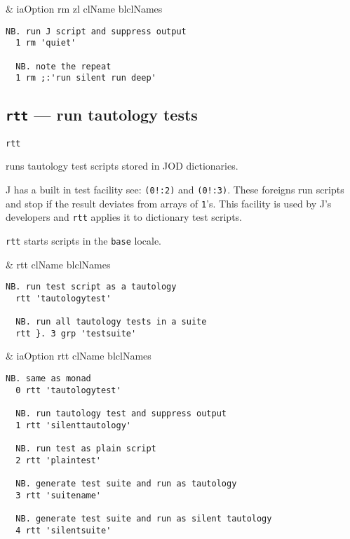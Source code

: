 \begin{wordhead}
\dyad & iaOption rm zl \argsep clName \argsep blclNames \\
\end{wordhead}
\begin{lstlisting}[frame=single,framerule=0pt] 
  NB. run J script and suppress output 
  1 rm 'quiet' 

  NB. note the repeat 
  1 rm ;:'run silent run deep' 
\end{lstlisting}                  


\subsection{\texttt{rtt} --- run tautology tests}\label{ss:rtt}

\hypertarget{il:rtt}{\texttt{rtt}} runs tautology 
test scripts stored in JOD dictionaries. 

J has a built in test facility see: \verb|(0!:2)| and \verb|(0!:3)|.  
These foreigns run scripts and stop if the result deviates 
from arrays of \texttt{1}'s.  This facility is used by J's developers 
and \texttt{rtt} applies it to dictionary test scripts.  
  
\texttt{rtt} starts scripts in the \texttt{base} locale. 

\begin{wordhead}
\monad & rtt clName \argsep blclNames \\
\end{wordhead}
\begin{lstlisting}[frame=single,framerule=0pt] 
  NB. run test script as a tautology
  rtt 'tautologytest'    
  
  NB. run all tautology tests in a suite 
  rtt }. 3 grp 'testsuite'  
\end{lstlisting}  

\begin{wordhead}
\dyad & iaOption rtt clName \argsep blclNames \\
\end{wordhead}
\begin{lstlisting}[frame=single,framerule=0pt] 
  NB. same as monad
  0 rtt 'tautologytest'    
  
  NB. run tautology test and suppress output 
  1 rtt 'silenttautology'  
  
  NB. run test as plain script
  2 rtt 'plaintest'        
  
  NB. generate test suite and run as tautology 
  3 rtt 'suitename'  
   
  NB. generate test suite and run as silent tautology      
  4 rtt 'silentsuite'      
\end{lstlisting}   

